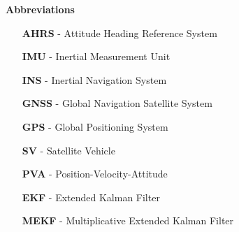 \makenomenclature
\renewcommand{\nomname}{Nomenclature} %
\renewcommand\nomgroup[1]{%
  \item[\bfseries
  \ifstrequal{#1}{G}{GNSS}{%
  \ifstrequal{#1}{N}{Kalman filter}{%
  \ifstrequal{#1}{O}{Other Symbols}{}}}%
]}
\renewcommand{\nompreamble}{}

\mbox{}


\printnomenclature
\vspace{0.5cm}
{\Large\bf Abbreviations}
\begin{enumerate}[labelwidth=4em,leftmargin =\labelwidth]
\item [\textbf{AHRS}] - Attitude Heading Reference System
\item [\textbf{IMU}] - Inertial Measurement Unit
\item [\textbf{INS}] - Inertial Navigation System
\item [\textbf{GNSS}] - Global Navigation Satellite System
\item [\textbf{GPS}] - Global Positioning System
\item [\textbf{SV}] - Satellite Vehicle
\item [\textbf{PVA}] - Position-Velocity-Attitude
\item [\textbf{EKF}] - Extended Kalman Filter
\item [\textbf{MEKF}] - Multiplicative Extended Kalman Filter
\end{enumerate}
